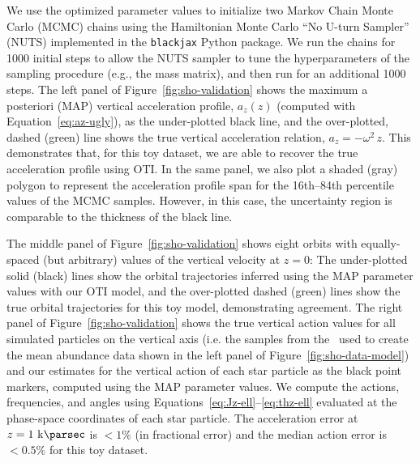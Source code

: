 We use the optimized parameter values to initialize two Markov Chain Monte Carlo (MCMC)
chains using the Hamiltonian Monte Carlo ``No U-turn Sampler'' (NUTS) implemented in the
\texttt{blackjax} \citep{blackjax} Python package.
We run the chains for 1000 initial steps to allow the NUTS sampler to tune the
hyperparameters of the sampling procedure (e.g., the mass matrix), and then run for an
additional 1000 steps.
The left panel of Figure~\ref{fig:sho-validation} shows the maximum a posteriori (MAP)
vertical acceleration profile, $a_z(z)$ (computed with Equation~\ref{eq:az-ugly}), as
the under-plotted black line, and the over-plotted, dashed (green) line shows the true
vertical acceleration relation, $a_z = -\omega^2 \, z$.
This demonstrates that, for this toy dataset, we are able to recover the true
acceleration profile using OTI.
In the same panel, we also plot a shaded (gray) polygon to represent the acceleration
profile span for the 16th--84th percentile values of the MCMC samples.
However, in this case, the uncertainty region is comparable to the thickness of the
black line.

The middle panel of Figure~\ref{fig:sho-validation} shows eight orbits with
equally-spaced (but arbitrary) values of the vertical velocity at $z=0$: The
under-plotted solid (black) lines show the orbital trajectories inferred using the MAP
parameter values with our OTI model, and the over-plotted dashed (green) lines show the
true orbital trajectories for this toy model, demonstrating agreement.
The right panel of Figure~\ref{fig:sho-validation} shows the true vertical action values
for all simulated particles on the vertical axis (i.e. the samples from the \df\ used to
create the mean abundance data shown in the left panel of
Figure~\ref{fig:sho-data-model}) and our estimates for the vertical action of each star
particle as the black point markers, computed using the MAP parameter values.
We compute the actions, frequencies, and angles using
Equations~\ref{eq:Jz-ell}--\ref{eq:thz-ell} evaluated at the phase-space coordinates of
each star particle.
The acceleration error at $z=1~\kpc$ is $< 1\%$ (in fractional error) and the median
action error is $<0.5\%$ for this toy dataset.

